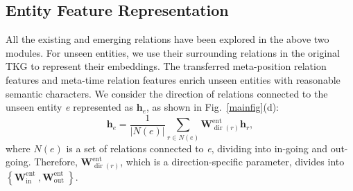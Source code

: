 \documentclass[sigconf]{acmart}
\begin{document}
\subsection{Entity Feature Representation} 
\par
All the existing and emerging relations have been explored in the above two modules. 
For unseen entities, we use their surrounding relations in the original TKG to represent their embeddings. The transferred meta-position relation features and meta-time relation features enrich unseen entities with reasonable semantic characters. We consider the direction of relations connected to the unseen entity \emph{e} represented as $\mathbf{h}_{e}$, as shown in Fig.~\ref{mainfig}(d):
\begin{equation}
\mathbf{h}_{e}=\frac{1}{| {N}(e)|} \sum_{r \in  {N}(e)} \mathbf{W}_{\operatorname{dir}(r)}^{\mathrm{ent}} \mathbf{h}_{r},
\end{equation}
where $ {N}(e)$ is a set of relations connected to \emph{e}, dividing into in-going and out-going. Therefore,  $\mathbf{W}_{\operatorname{dir}(r)}^{\text {ent }}$, which is a direction-specific parameter, divides into $\left \{   \mathbf{W}_{\text {in }}^{\text {ent }},  \mathbf{W}_{\text {out }}^{\text {ent }}  \right \}$. 
\end{document}
